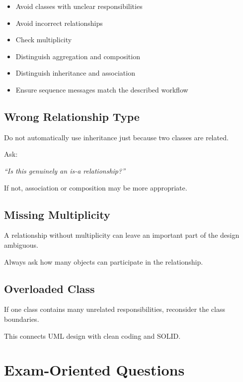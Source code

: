 \documentclass[11pt,a4paper]{article}
\newcommand{\checkitem}{$\square$}
\begin{document}
\begin{itemize}[label=\checkitem]
    \item Avoid classes with unclear responsibilities
    \item Avoid incorrect relationships
    \item Check multiplicity
    \item Distinguish aggregation and composition
    \item Distinguish inheritance and association
    \item Ensure sequence messages match the described workflow
\end{itemize}

\subsection{Wrong Relationship Type}

Do not automatically use inheritance just because two classes are related.

Ask:

\begin{center}
\textit{``Is this genuinely an is-a relationship?''}
\end{center}

If not, association or composition may be more appropriate.

\subsection{Missing Multiplicity}

A relationship without multiplicity can leave an important part of the design
ambiguous.

Always ask how many objects can participate in the relationship.

\subsection{Overloaded Class}

If one class contains many unrelated responsibilities, reconsider the class
boundaries.

This connects UML design with clean coding and SOLID.

\section{Exam-Oriented Questions}
\end{document}
